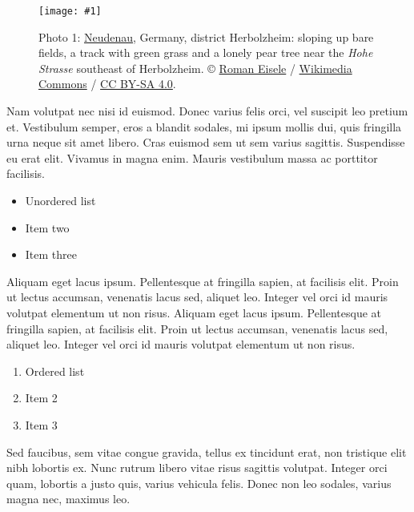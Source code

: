 \documentclass{article}
\newlength{\imgwidth}
\newcommand\scaledgraphics[2]{%
                
\settowidth{\imgwidth}{\texttt{[image: \#1]}}%
                
\setlength{\imgwidth}{\minof{\imgwidth}{#2\textwidth}}%
                
\texttt{[image: \#1]}%
                
}
\begin{document}
\begin{figure}
\scaledgraphics{59e004b3-4b39-4130-a034-44e37904524f.jpeg}{1}
\caption*{Photo 1: \href{https://en.wikipedia.org/wiki/Neudenau}{Neudenau}, Germany, district Herbolzheim: sloping up bare fields, a track with green grass and a lonely pear tree near the \emph{Hohe Strasse} southeast of Herbolzheim. © \href{https://commons.wikimedia.org/wiki/User:Aristeas}{Roman Eisele} / \href{https://commons.wikimedia.org/wiki/Main_Page}{Wikimedia Commons} / \href{https://creativecommons.org/licenses/by-sa/4.0/}{CC BY-SA 4.0}.}\label{F6617821}
\end{figure}


Nam volutpat nec nisi id euismod. Donec varius felis orci, vel suscipit leo pretium et. Vestibulum semper, eros a blandit sodales, mi ipsum mollis dui, quis fringilla urna neque sit amet libero. Cras euismod sem ut sem varius sagittis. Suspendisse eu erat elit. Vivamus in magna enim. Mauris vestibulum massa ac porttitor facilisis.

\begin{itemize}
\item Unordered list


\item Item two


\item Item three


\end{itemize}

Aliquam eget lacus ipsum. Pellentesque at fringilla sapien, at facilisis elit. Proin ut lectus accumsan, venenatis lacus sed, aliquet leo. Integer vel orci id mauris volutpat elementum ut non risus. Aliquam eget lacus ipsum. Pellentesque at fringilla sapien, at facilisis elit. Proin ut lectus accumsan, venenatis lacus sed, aliquet leo. Integer vel orci id mauris volutpat elementum ut non risus. 

\begin{enumerate}
\item Ordered list


\item Item 2


\item Item 3


\end{enumerate}

Sed faucibus, sem vitae congue gravida, tellus ex tincidunt erat, non tristique elit nibh lobortis ex. Nunc rutrum libero vitae risus sagittis volutpat. Integer orci quam, lobortis a justo quis, varius vehicula felis. Donec non leo sodales, varius magna nec, maximus leo. 
\end{document}
